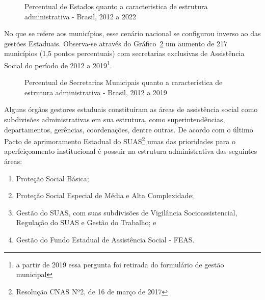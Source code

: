 \documentclass[
  letterpaper,
  DIV=11,
  numbers=noendperiod]{scrreprt}
\providecommand{\tightlist}{%
  \setlength{\itemsep}{0pt}\setlength{\parskip}{0pt}}\usepackage{longtable,booktabs,array}
\begin{document}
\begin{figure}


\caption{\label{fig-estados_sec_exc}Percentual de Estados quanto a
caracteristica de estrutura administrativa - Brasil, 2012 a 2022}

\end{figure}%

No que se refere aos municípios, esse cenário nacional se configurou
inverso ao das gestões Estaduais. Observa-se através do
Gráfico~\ref{fig-sec-munic-exc} um aumento de 217 municípios (1,5 pontos
percentuais) com secretarias exclusivas de Assistência Social do período
de 2012 a 2019\footnote{a partir de 2019 essa pergunta foi retirada do
  formulário de gestão municipal}.

\begin{figure}


\caption{\label{fig-sec-munic-exc}Percentual de Secretarias Municipais
quanto a caracteristica de estrutura administrativa - Brasil, 2012 a
2019}

\end{figure}%

Alguns órgãos gestores estaduais constituíram as áreas de assistência
social como subdivisões administrativas em sua estrutura, como
superintendências, departamentos, gerências, coordenações, dentre
outras. De acordo com o último Pacto de aprimoramento Estadual do
SUAS\footnote{Resolução CNAS Nº2, de 16 de março de 2017} umas das
prioridades para o aperfeiçoamento institucional é possuir na estrutura
administrativa das seguintes áreas:

\begin{enumerate}
\def\labelenumi{\arabic{enumi})}
\tightlist
\item
  Proteção Social Básica;
\item
  Proteção Social Especial de Média e Alta Complexidade;
\item
  Gestão do SUAS, com suas subdivisões de Vigilância Socioassistencial,
  Regulação do SUAS e Gestão do Trabalho; e
\item
  Gestão do Fundo Estadual de Assistência Social - FEAS.
\end{enumerate}
\end{document}
